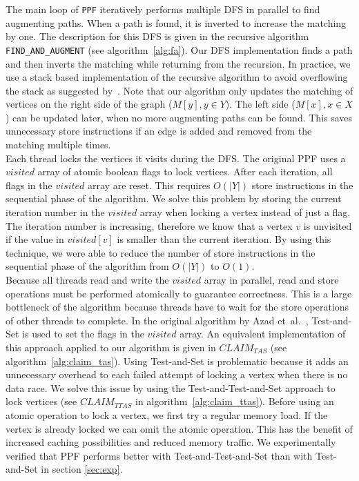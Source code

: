 \documentclass[letterpaper]{article}
\begin{document}
The main loop of \texttt{PPF} iteratively performs multiple DFS in parallel to find augmenting paths. 
When a path is found, it is inverted to increase the matching by one.
The description for this DFS is given in the recursive algorithm \texttt{FIND\_AND\_AUGMENT} (see algorithm~\ref{alg:fa}). 
Our DFS implementation finds a path and then inverts the matching while returning from the recursion. 
In practice, we use a stack based implementation of the recursive algorithm to avoid overflowing the stack as suggested by~\cite{Azad:2012}. 
Note that our algorithm only updates the matching of vertices on the right side of the graph ($M[y], y \in Y$). 
The left side ($M[x], x \in X$) can be updated later, when no more augmenting paths can be found. 
This saves unnecessary store instructions if an edge is added and removed from the matching multiple times.\\

Each thread locks the vertices it visits during the DFS. The original PPF uses a $visited$ array of atomic boolean flags to lock vertices. 
After each iteration, all flags in the $visited$ array are reset. This requires $O(|Y|)$ store instructions in the sequential phase of the algorithm. 
We solve this problem by storing the current iteration number in the $visited$ array when locking a vertex instead of just a flag. The iteration number is increasing, 
therefore we know that a vertex $v$ is unvisited if the value in $visited[v]$ is smaller than the current iteration. 
By using this technique, we were able to reduce the number of store instructions in the sequential phase of the algorithm from $O(|Y|)$ to $O(1)$.\\

Because all threads read and write the $visited$ array in parallel, read and store operations must be performed atomically to guarantee correctness. 
This is a large bottleneck of the algorithm because threads have to wait for the store operations of other threads to complete. 
In the original algorithm by Azad et\ al.~\cite{Azad:2012}, Test-and-Set is used to set the flags in the $visited$ array. 
An equivalent implementation of this approach applied to our algorithm is given in \texttt{$CLAIM_{TAS}$} (see algorithm~\ref{alg:claim_tas}). 
Using Test-and-Set is problematic because it adds an unnecessary overhead to each failed attempt of locking a vertex when there is no data race. 
We solve this issue by using the Test-and-Test-and-Set approach to lock vertices (see \texttt{$CLAIM_{TTAS}$} in algorithm~\ref{alg:claim_ttas}).
Before using an atomic operation to lock a vertex, we first try a regular memory load. If the vertex is already locked we can omit the atomic operation. 
This has the benefit of increased caching possibilities and reduced memory traffic. 
We experimentally verified that PPF performs better with Test-and-Test-and-Set than with Test-and-Set in section \ref{sec:exp}.
\end{document}

